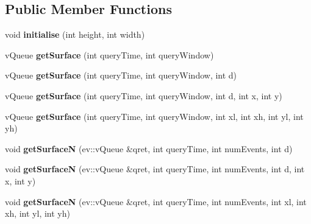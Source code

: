 \subsection*{Public Member Functions}
\begin{DoxyCompactItemize}
\item 
\mbox{\label{classev_1_1historicalSurface_adbe662bedcf6ee9c87f9b78d15c8ae85}} 
void {\bfseries initialise} (int height, int width)
\item 
\mbox{\label{classev_1_1historicalSurface_a03476e5a9cff0d369fef76711c6ebea5}} 
v\+Queue {\bfseries get\+Surface} (int query\+Time, int query\+Window)
\item 
\mbox{\label{classev_1_1historicalSurface_a289a2d3cb116fb1cdb99d38b03d74dd0}} 
v\+Queue {\bfseries get\+Surface} (int query\+Time, int query\+Window, int d)
\item 
\mbox{\label{classev_1_1historicalSurface_a10f0938bac2fc0b7a0f5624dfcd65f2f}} 
v\+Queue {\bfseries get\+Surface} (int query\+Time, int query\+Window, int d, int x, int y)
\item 
\mbox{\label{classev_1_1historicalSurface_a18830cb21753a190270bf03108c95f71}} 
v\+Queue {\bfseries get\+Surface} (int query\+Time, int query\+Window, int xl, int xh, int yl, int yh)
\item 
\mbox{\label{classev_1_1historicalSurface_ae423da2b112194abd11e837e7142a71d}} 
void {\bfseries get\+SurfaceN} (ev\+::v\+Queue \&qret, int query\+Time, int num\+Events, int d)
\item 
\mbox{\label{classev_1_1historicalSurface_afa98f88d820fd48698a2470857440a81}} 
void {\bfseries get\+SurfaceN} (ev\+::v\+Queue \&qret, int query\+Time, int num\+Events, int d, int x, int y)
\item 
\mbox{\label{classev_1_1historicalSurface_a7d2fa665ed41226f22b90c11b3c2f00d}} 
void {\bfseries get\+SurfaceN} (ev\+::v\+Queue \&qret, int query\+Time, int num\+Events, int xl, int xh, int yl, int yh)
\end{DoxyCompactItemize}
